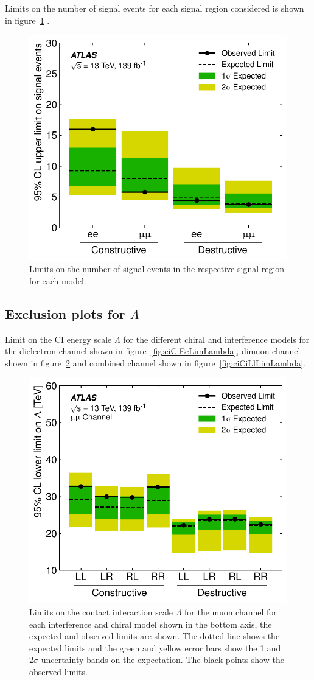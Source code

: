 Limits on the number of signal events for each signal region considered is shown in figure~\ref{fig:ciCiLimNSig} .

\begin{figure}[htb!]
\begin{center}
\includegraphics[width=0.5\linewidth]{figures/ci/results/fig_03a.pdf}
\end{center}
\vspace{-.4cm}
\caption{Limits on the number of signal events in the respective signal region for each model. }
\label{fig:ciCiLimNSig}
\end{figure}

\subsection{Exclusion plots for $\Lambda$}
Limit on the CI energy scale $\Lambda$ for the different chiral and interference models for the dielectron channel shown in figure~\ref{fig:ciCiEeLimLambda}, dimuon channel shown in figure~\ref{fig:ciCiMmLimLambda} and combined channel shown in figure~\ref{fig:ciCiLlLimLambda}.

\begin{figure}[htb]
\begin{center}
\includegraphics[width=0.5\linewidth]{figures/ci/results/fig_04a.pdf}
\end{center}
\vspace{-.4cm}
\caption{Limits on the contact interaction scale $\Lambda$ for the muon channel for each interference and chiral model shown in the bottom axis, the expected and observed limits are shown. The dotted line shows the expected limits and the green and yellow error bars show the 1 and $2\sigma$ uncertainty bands on the expectation. The black points show the observed limits.}
\label{fig:ciCiMmLimLambda}
\end{figure}

